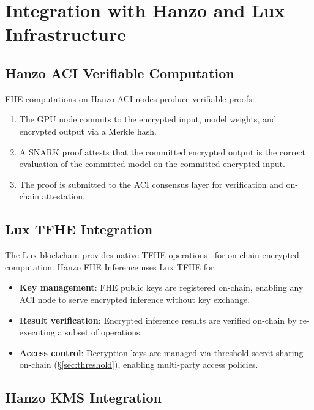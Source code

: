 \section{Integration with Hanzo and Lux Infrastructure}

\label{sec:integration}

\subsection{Hanzo ACI Verifiable Computation}

FHE computations on Hanzo ACI nodes produce verifiable proofs:
\begin{enumerate}[leftmargin=1.4em]
    \item The GPU node commits to the encrypted input, model weights, and
    encrypted output via a Merkle hash.
    \item A SNARK proof attests that the committed encrypted output is the
    correct evaluation of the committed model on the committed encrypted input.
    \item The proof is submitted to the ACI consensus layer for verification
    and on-chain attestation.
\end{enumerate}

\subsection{Lux TFHE Integration}

The Lux blockchain provides native TFHE operations~\cite{luxtfhe} for on-chain
encrypted computation. Hanzo FHE Inference uses Lux TFHE for:
\begin{itemize}[leftmargin=1.1em]
    \item \textbf{Key management}: FHE public keys are registered on-chain,
    enabling any ACI node to serve encrypted inference without key exchange.
    \item \textbf{Result verification}: Encrypted inference results are
    verified on-chain by re-executing a subset of operations.
    \item \textbf{Access control}: Decryption keys are managed via
    threshold secret sharing on-chain (\S\ref{sec:threshold}), enabling
    multi-party access policies.
\end{itemize}

\subsection{Hanzo KMS Integration}

